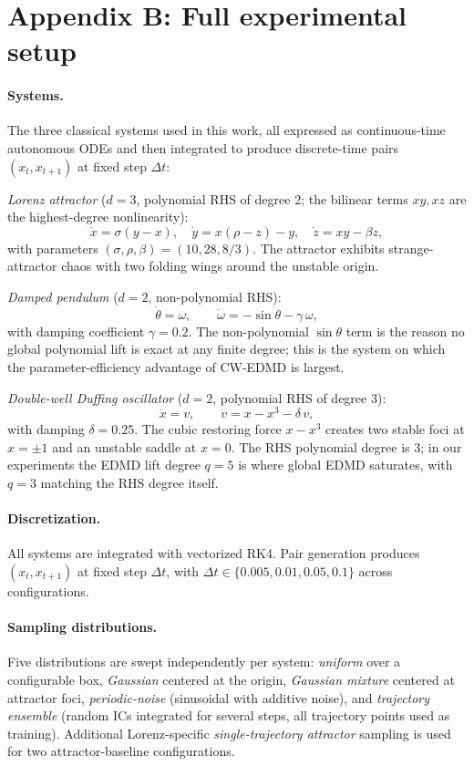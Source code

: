 \documentclass{article}
\begin{document}
\section*{Appendix B: Full experimental setup}

\paragraph{Systems.} The three classical systems used in this work, all expressed as continuous-time autonomous ODEs and then integrated to produce discrete-time pairs $(x_t, x_{t+1})$ at fixed step $\Delta t$:

\emph{Lorenz attractor} ($d=3$, polynomial RHS of degree 2; the bilinear terms $xy, xz$ are the highest-degree nonlinearity):
\[
\dot{x} = \sigma(y - x), \quad
\dot{y} = x(\rho - z) - y, \quad
\dot{z} = x y - \beta z,
\]
with parameters $(\sigma, \rho, \beta) = (10, 28, 8/3)$. The attractor exhibits strange-attractor chaos with two folding wings around the unstable origin.

\emph{Damped pendulum} ($d=2$, non-polynomial RHS):
\[
\dot{\theta} = \omega, \qquad
\dot{\omega} = -\sin\theta - \gamma\, \omega,
\]
with damping coefficient $\gamma = 0.2$. The non-polynomial $\sin\theta$ term is the reason no global polynomial lift is exact at any finite degree; this is the system on which the parameter-efficiency advantage of CW-EDMD is largest.

\emph{Double-well Duffing oscillator} ($d=2$, polynomial RHS of degree 3):
\[
\dot{x} = v, \qquad
\dot{v} = x - x^3 - \delta\, v,
\]
with damping $\delta = 0.25$. The cubic restoring force $x - x^3$ creates two stable foci at $x = \pm 1$ and an unstable saddle at $x = 0$. The RHS polynomial degree is 3; in our experiments the EDMD lift degree $q{=}5$ is where global EDMD saturates, with $q{=}3$ matching the RHS degree itself.

\paragraph{Discretization.} All systems are integrated with vectorized RK4. Pair generation produces $(x_t, x_{t+1})$ at fixed step $\Delta t$, with $\Delta t \in \{0.005, 0.01, 0.05, 0.1\}$ across configurations.

\paragraph{Sampling distributions.} Five distributions are swept independently per system: \emph{uniform} over a configurable box, \emph{Gaussian} centered at the origin, \emph{Gaussian mixture} centered at attractor foci, \emph{periodic-noise} (sinusoidal with additive noise), and \emph{trajectory ensemble} (random ICs integrated for several steps, all trajectory points used as training). Additional Lorenz-specific \emph{single-trajectory attractor} sampling is used for two attractor-baseline configurations.
\end{document}
